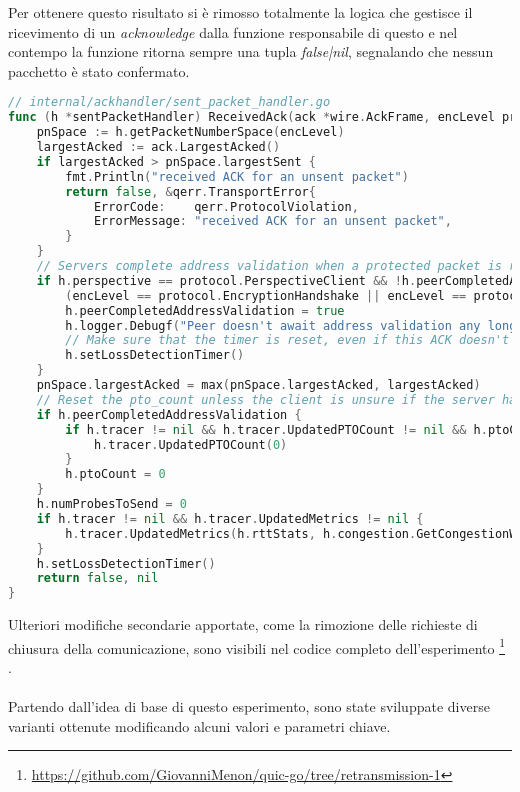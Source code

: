 Per ottenere questo risultato si è rimosso totalmente la logica che gestisce il ricevimento di un \emph{acknowledge} dalla funzione responsabile di questo e nel contempo la funzione ritorna sempre una tupla \emph{false|nil}, 
segnalando che nessun pacchetto è stato confermato.
\\
\begin{lstlisting}[language=Go]
// internal/ackhandler/sent_packet_handler.go
func (h *sentPacketHandler) ReceivedAck(ack *wire.AckFrame, encLevel protocol.EncryptionLevel, rcvTime time.Time) (bool /* contained 1-RTT packet */, error) { 
    pnSpace := h.getPacketNumberSpace(encLevel)
    largestAcked := ack.LargestAcked()
    if largestAcked > pnSpace.largestSent {
        fmt.Println("received ACK for an unsent packet")
        return false, &qerr.TransportError{
            ErrorCode:    qerr.ProtocolViolation,
            ErrorMessage: "received ACK for an unsent packet",
        }
    }
    // Servers complete address validation when a protected packet is received.
    if h.perspective == protocol.PerspectiveClient && !h.peerCompletedAddressValidation &&
        (encLevel == protocol.EncryptionHandshake || encLevel == protocol.Encryption1RTT) {
        h.peerCompletedAddressValidation = true
        h.logger.Debugf("Peer doesn't await address validation any longer.")
        // Make sure that the timer is reset, even if this ACK doesn't acknowledge any (ack-eliciting) packets.
        h.setLossDetectionTimer()
    }
    pnSpace.largestAcked = max(pnSpace.largestAcked, largestAcked)
    // Reset the pto_count unless the client is unsure if the server has validated the client's address.
	if h.peerCompletedAddressValidation {
		if h.tracer != nil && h.tracer.UpdatedPTOCount != nil && h.ptoCount != 0 {
			h.tracer.UpdatedPTOCount(0)
		}
		h.ptoCount = 0
	}
	h.numProbesToSend = 0
	if h.tracer != nil && h.tracer.UpdatedMetrics != nil {
		h.tracer.UpdatedMetrics(h.rttStats, h.congestion.GetCongestionWindow(), h.bytesInFlight, h.packetsInFlight())
	}
	h.setLossDetectionTimer()
	return false, nil
}
\end{lstlisting}
\noindent Ulteriori modifiche secondarie apportate, come la rimozione delle richieste di chiusura della comunicazione, sono visibili nel codice completo dell'esperimento \footnote{\url{https://github.com/GiovanniMenon/quic-go/tree/retransmission-1}} \cite{site:my-fork}.
\\\\
Partendo dall'idea di base di questo esperimento, sono state sviluppate diverse varianti ottenute modificando alcuni valori e parametri chiave.
